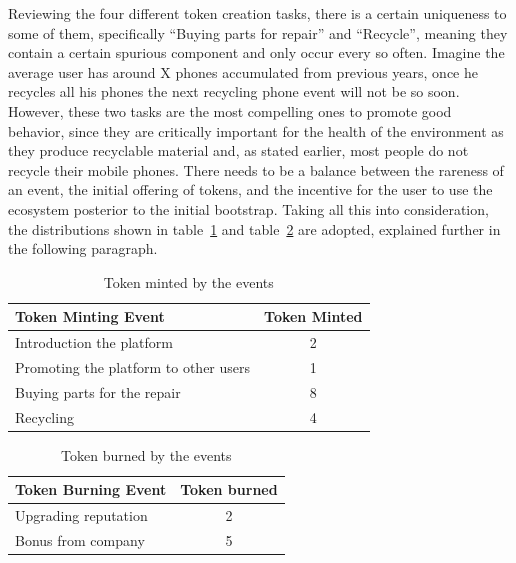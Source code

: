 \documentclass[11pt]{scrartcl}
\begin{document}
Reviewing the four different token creation tasks, there is a certain uniqueness to some of them, specifically ``Buying parts for repair'' and ``Recycle'', meaning they contain a certain spurious component and only occur every so often. Imagine the average user has around X phones accumulated from previous years, once he recycles all his phones the next recycling phone event will not be so soon. However, these two tasks are the most compelling ones to promote good behavior, since they are critically important for the health of the environment as they produce recyclable material and, as stated earlier, most people do not recycle their mobile phones. There needs to be a balance between the rareness of an event, the initial offering of tokens, and the incentive for the user to use the ecosystem posterior to the initial bootstrap.  Taking all this into consideration, the distributions shown in table~\ref{tbl:mint_evt} and table~\ref{tbl:tok_burn} are adopted, explained further in the following paragraph.

\begin{table}[H]
    \centering
    \begin{tabular}{l c}
        \toprule
        \textbf{Token Minting Event} & \textbf{Token Minted} \\ \midrule
        Introduction the platform & 2 \\ \midrule
        Promoting the platform to other users & 1 \\ \midrule
        Buying parts for the repair & 8 \\ \midrule
        Recycling & 4 \\ \bottomrule
    \end{tabular}
    \caption{Token minted by the events}%
    \label{tbl:mint_evt}
\end{table}

\begin{table}[H]
    \centering
    \begin{tabular}{l c}
        \toprule
        \textbf{Token Burning Event} & \textbf{Token burned} \\ \midrule
        Upgrading reputation & 2 \\ \midrule
        Bonus from company& 5 \\ \bottomrule
    \end{tabular}
    \caption{Token burned by the events}%
    \label{tbl:tok_burn}
\end{table}
\end{document}
